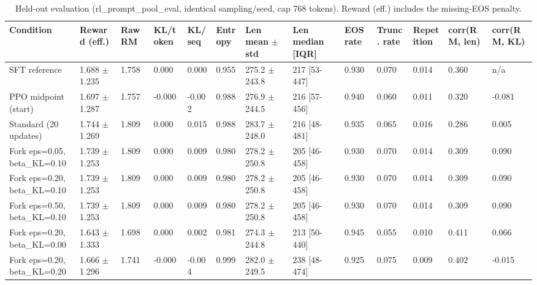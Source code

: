 \begin{table}[t]
\centering
\small
\caption{Held-out evaluation (rl\_prompt\_pool\_eval, identical sampling/seed, cap 768 tokens). Reward (eff.) includes the missing-EOS penalty.}
\begin{tabular}{lllllllllllll}
\toprule
Condition & Reward (eff.) & Raw RM & KL/token & KL/seq & Entropy & Len mean $\pm$ std & Len median [IQR] & EOS rate & Trunc. rate & Repetition & corr(RM, len) & corr(RM, KL) \\
\midrule
SFT reference & 1.688 $\pm$ 1.235 & 1.758 & 0.000 & 0.000 & 0.955 & 275.2 $\pm$ 243.8 & 217 [53-447] & 0.930 & 0.070 & 0.014 & 0.360 & n/a \\
PPO midpoint (start) & 1.697 $\pm$ 1.287 & 1.757 & -0.000 & -0.002 & 0.988 & 276.9 $\pm$ 244.5 & 216 [57-456] & 0.940 & 0.060 & 0.011 & 0.320 & -0.081 \\
Standard (20 updates) & 1.744 $\pm$ 1.269 & 1.809 & 0.000 & 0.015 & 0.988 & 283.7 $\pm$ 248.0 & 216 [48-481] & 0.935 & 0.065 & 0.016 & 0.286 & 0.005 \\
Fork eps=0.05, beta\_KL=0.10 & 1.739 $\pm$ 1.253 & 1.809 & 0.000 & 0.009 & 0.980 & 278.2 $\pm$ 250.8 & 205 [46-458] & 0.930 & 0.070 & 0.014 & 0.309 & 0.090 \\
Fork eps=0.20, beta\_KL=0.10 & 1.739 $\pm$ 1.253 & 1.809 & 0.000 & 0.009 & 0.980 & 278.2 $\pm$ 250.8 & 205 [46-458] & 0.930 & 0.070 & 0.014 & 0.309 & 0.090 \\
Fork eps=0.50, beta\_KL=0.10 & 1.739 $\pm$ 1.253 & 1.809 & 0.000 & 0.009 & 0.980 & 278.2 $\pm$ 250.8 & 205 [46-458] & 0.930 & 0.070 & 0.014 & 0.309 & 0.090 \\
Fork eps=0.20, beta\_KL=0.00 & 1.643 $\pm$ 1.333 & 1.698 & 0.000 & 0.002 & 0.981 & 274.3 $\pm$ 244.8 & 213 [50-440] & 0.945 & 0.055 & 0.010 & 0.411 & 0.066 \\
Fork eps=0.20, beta\_KL=0.20 & 1.666 $\pm$ 1.296 & 1.741 & -0.000 & -0.004 & 0.999 & 282.0 $\pm$ 249.5 & 238 [48-474] & 0.925 & 0.075 & 0.009 & 0.402 & -0.015 \\
\bottomrule
\end{tabular}
\end{table}
